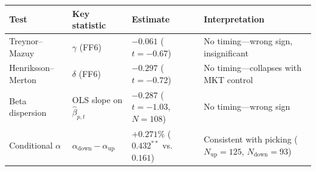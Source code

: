 \begin{tabular}{llll}
\toprule
Test & Key statistic & Estimate & Interpretation \\
\midrule
Treynor--Mazuy & $\gamma$ (FF6) & $-0.061$ ($t = -0.67$) & No timing---wrong sign, insignificant \\
Henriksson--Merton & $\delta$ (FF6) & $-0.297$ ($t = -0.72$) & No timing---collapses with MKT control \\
Beta dispersion & OLS slope on $\hat\beta_{p,t}$ & $-0.287$ ($t = -1.03$, $N=108$) & No timing---wrong sign \\
Conditional $\alpha$ & $\alpha_{\text{down}} - \alpha_{\text{up}}$ & $+0.271\%$ ($0.432^{**}$ vs.\ $0.161$) & Consistent with picking ($N_{\text{up}}=125$, $N_{\text{down}}=93$) \\
\bottomrule
\end{tabular}